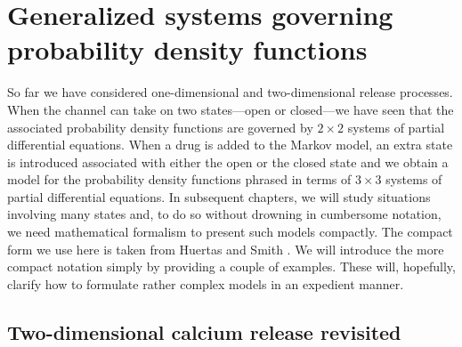 \chapter[Generalized systems]{Generalized systems governing probability density functions
\label{general}}

So far we have considered one-dimensional and two-dimensional release processes. When the
channel can take on two states---open or closed---we have seen that the
associated probability density functions are governed by $2\times2$ systems of
partial differential equations. When a drug is added to the Markov model, an
extra state is introduced associated with either the open or the closed state 
and we obtain a model for the probability density functions phrased in terms of 
$3\times3$ systems of partial differential equations. In subsequent 
chapters, we will study situations involving many states and, to do so 
without drowning in cumbersome notation, we need mathematical formalism to 
present such models compactly. The compact form we use here is taken 
from Huertas and Smith \cite{Huertas2007}. We will introduce the more compact
notation simply by providing a couple of examples. These will,
hopefully, clarify how to formulate rather complex models in an expedient manner.

\bigskip
\section{Two-dimensional calcium release revisited}

